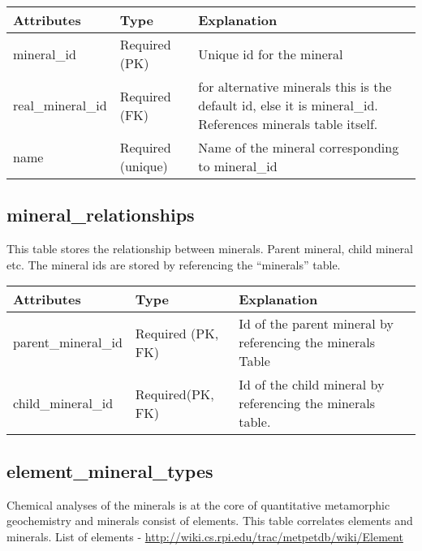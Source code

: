 \documentclass[letterpaper,10pt,english]{sphinxmanual}
\begin{document}
\begin{tabulary}{\linewidth}{|L|L|L|}
\hline
\textbf{
Attributes
} & \textbf{
Type
} & \textbf{
Explanation
}\\\hline

mineral\_id
 & 
Required (PK)
 & 
Unique id for the mineral
\\\hline

real\_mineral\_id
 & 
Required (FK)
 & 
for alternative minerals this is the default id, else it is
mineral\_id. References minerals table itself.
\\\hline

name
 & 
Required (unique)
 & 
Name of the mineral corresponding to
mineral\_id
\\\hline
\end{tabulary}



\subsection{mineral\_relationships}
\label{Table_Description:mineral-relationships}
This table stores the relationship between minerals. Parent mineral, child mineral etc. The mineral ids are stored by referencing the “minerals” table.

\begin{tabulary}{\linewidth}{|L|L|L|}
\hline
\textbf{
Attributes
} & \textbf{
Type
} & \textbf{
Explanation
}\\\hline

parent\_mineral\_id
 & 
Required (PK, FK)
 & 
Id of the parent mineral by referencing the minerals Table
\\\hline

child\_mineral\_id
 & 
Required(PK, FK)
 & 
Id of the child mineral by referencing the minerals table.
\\\hline
\end{tabulary}



\subsection{element\_mineral\_types}
\label{Table_Description:element-mineral-types}
Chemical analyses of the minerals is at the core of quantitative metamorphic geochemistry and minerals consist of elements.
This table correlates elements and minerals.
List of elements -  \href{http://wiki.cs.rpi.edu/trac/metpetdb/wiki/Element}{http://wiki.cs.rpi.edu/trac/metpetdb/wiki/Element}
\end{document}
